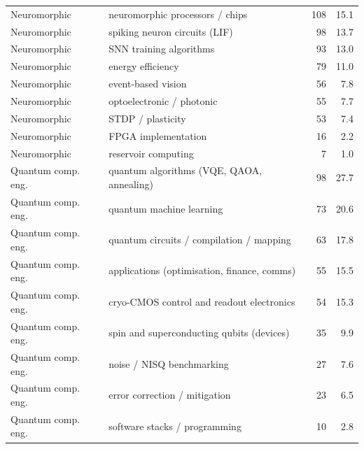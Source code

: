 \documentclass[10pt]{article}
\begin{document}
\begin{longtable}{@{}lL{8cm}rr@{}}
Neuromorphic & neuromorphic processors / chips & 108 & 15.1 \\
Neuromorphic & spiking neuron circuits (LIF) & 98 & 13.7 \\
Neuromorphic & SNN training algorithms & 93 & 13.0 \\
Neuromorphic & energy efficiency & 79 & 11.0 \\
Neuromorphic & event-based vision & 56 & 7.8 \\
Neuromorphic & optoelectronic / photonic & 55 & 7.7 \\
Neuromorphic & STDP / plasticity & 53 & 7.4 \\
Neuromorphic & FPGA implementation & 16 & 2.2 \\
Neuromorphic & reservoir computing & 7 & 1.0 \\
Quantum comp. eng. & quantum algorithms (VQE, QAOA, annealing) & 98 & 27.7 \\
Quantum comp. eng. & quantum machine learning & 73 & 20.6 \\
Quantum comp. eng. & quantum circuits / compilation / mapping & 63 & 17.8 \\
Quantum comp. eng. & applications (optimisation, finance, comms) & 55 & 15.5 \\
Quantum comp. eng. & cryo-CMOS control and readout electronics & 54 & 15.3 \\
Quantum comp. eng. & spin and superconducting qubits (devices) & 35 & 9.9 \\
Quantum comp. eng. & noise / NISQ benchmarking & 27 & 7.6 \\
Quantum comp. eng. & error correction / mitigation & 23 & 6.5 \\
Quantum comp. eng. & software stacks / programming & 10 & 2.8 \\
\end{longtable}
\end{document}
